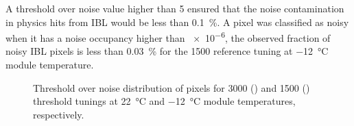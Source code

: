 A threshold over noise value higher than 5 ensured that the noise contamination in physics hits from IBL would be less than \SI{0.1}{\percent}. A pixel was classified as noisy when it has a noise occupancy higher than \num{e-6}, the observed fraction of noisy IBL pixels is less than \SI{0.03}{\percent} for the \SI{1500}{\e} reference tuning at \SI{-12}{\celsius} module temperature.
\begin{figure}
        \centering
        \caption{Threshold over noise distribution of pixels for \SI{3000}{\e} () and \SI{1500}{\e} () threshold tunings at \SI{22}{\celsius} and \SI{-12}{\celsius} module temperatures, respectively.}
         \label{fig:ThresholdOverNoise}
\end{figure}

